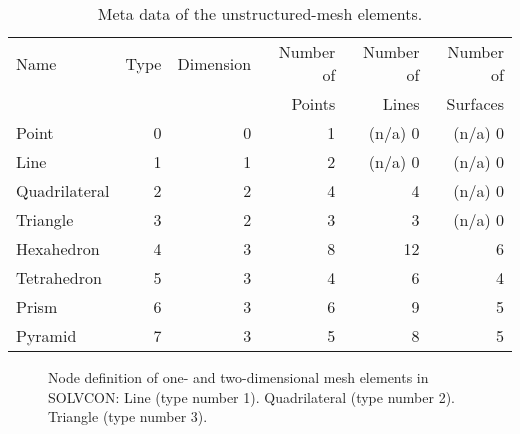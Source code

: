 \documentclass[11pt,dvips]{article}
\newcommand{\topcaption}{%
\setlength{\abovecaptionskip}{0pt}%
\setlength{\belowcaptionskip}{10pt}%
\caption}
\numberwithin{equation}{section}
\begin{document}
%
\begin{table}[h]
\centering

\topcaption{
%
Meta data of the unstructured-mesh elements.
%
}

\label{t:elm:meta}
\begin{tabular}{lrrrrr}
\toprule
Name          & Type & Dimension & Number of & Number of & Number of \\
              &      &           &    Points &     Lines &  Surfaces \\
\midrule
Point         & 0    & 0         & 1         & (n/a) 0   & (n/a) 0   \\
Line          & 1    & 1         & 2         & (n/a) 0   & (n/a) 0   \\
Quadrilateral & 2    & 2         & 4         & 4         & (n/a) 0   \\
Triangle      & 3    & 2         & 3         & 3         & (n/a) 0   \\
Hexahedron    & 4    & 3         & 8         & 12        & 6         \\
Tetrahedron   & 5    & 3         & 4         & 6         & 4         \\
Prism         & 6    & 3         & 6         & 9         & 5         \\
Pyramid       & 7    & 3         & 5         & 8         & 5         \\
\bottomrule
\end{tabular}
\end{table}
%

%
\begin{figure}
\centering
{}

\caption{
%
Node definition of one- and two-dimensional mesh elements in SOLVCON:
%
 Line (type number 1).
%
 Quadrilateral (type number 2).
%
 Triangle (type number 3).
%
}

\label{f:elm2d}
\end{figure}
%
\end{document}
